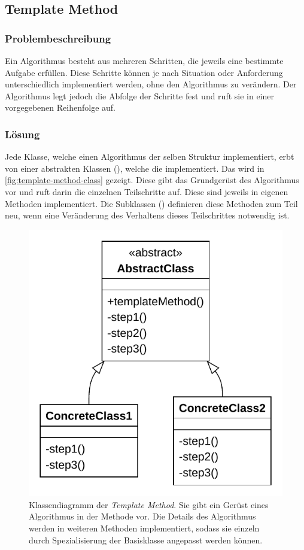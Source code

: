 \subsection{Template Method}

\subsubsection*{Problembeschreibung}

Ein Algorithmus besteht aus mehreren Schritten, die jeweils eine bestimmte Aufgabe erfüllen. Diese Schritte können je nach Situation oder Anforderung unterschiedlich implementiert werden, ohne den Algorithmus zu verändern. Der Algorithmus legt jedoch die Abfolge der Schritte fest und ruft sie in einer vorgegebenen Reihenfolge auf. \cite{gamma_design_1995}

\subsubsection*{Lösung}

Jede Klasse, welche einen Algorithmus der selben Struktur implementiert, erbt von einer abstrakten Klassen (), welche die  implementiert. Das wird in \autoref{fig:template-method-class} gezeigt. Diese gibt das Grundgerüst des Algorithmus vor und ruft darin die einzelnen Teilschritte auf. Diese sind jeweils in eigenen Methoden implementiert. Die Subklassen () definieren diese Methoden zum Teil neu, wenn eine Veränderung des Verhaltens dieses Teilschrittes notwendig ist.

\begin{figure}[!ht]
	\centering
	\includegraphics[width=0.55\linewidth]{images/patterns/template-method-class.pdf}
	\caption{Klassendiagramm der \emph{Template Method}. Sie gibt ein Gerüst eines Algorithmus in der Methode  vor. Die Details des Algorithmus werden in weiteren Methoden implementiert, sodass sie einzeln durch Spezialisierung der Basisklasse angepasst werden können. \cite{skobeleva_template_2023}}
	\label{fig:template-method-class}
\end{figure}

